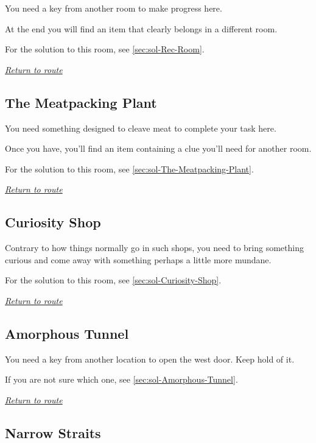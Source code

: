 \documentclass[a5paper]{extarticle}
\begin{document}
You need a key from another room to make progress here.

At the end you will find an item that clearly belongs in a different room.

For the solution to this room, see \cref{sec:sol-Rec-Room}.

\hyperref[sec:route-11]{\emph{Return to route}}

\newpage
\subsection{The Meatpacking Plant}\label{sec:req-The-Meatpacking-Plant}

You need something designed to cleave meat to complete your task here.

Once you have, you'll find an item containing a clue you'll need for another room.

For the solution to this room, see \cref{sec:sol-The-Meatpacking-Plant}.

\hyperref[sec:route-11]{\emph{Return to route}}

\newpage
\subsection{Curiosity Shop}\label{sec:req-Curiosity-Shop}

Contrary to how things normally go in such shops, you need to bring something
curious and come away with something perhaps a little more mundane.

For the solution to this room, see \cref{sec:sol-Curiosity-Shop}.

\hyperref[sec:route-12]{\emph{Return to route}}

\newpage
\subsection{Amorphous Tunnel}\label{sec:req-Amorphous-Tunnel}

You need a key from another location to open the west door. Keep hold of it.

If you are not sure which one, see \cref{sec:sol-Amorphous-Tunnel}.

\hyperref[sec:route-12]{\emph{Return to route}}

\newpage
\subsection{Narrow Straits}\label{sec:req-Narrow-Straits}
\end{document}
